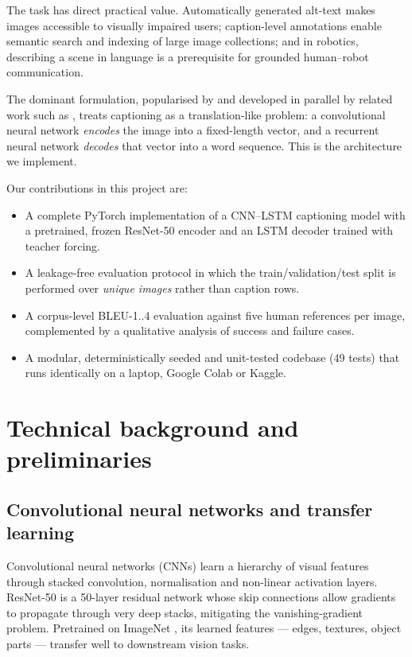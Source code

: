 \documentclass{article}
\begin{document}
The task has direct practical value. Automatically generated alt-text makes images accessible to visually impaired users; caption-level annotations enable semantic search and indexing of large
image collections; and in robotics, describing a scene in language is a prerequisite for grounded human--robot communication.

The dominant formulation, popularised by \citet{vinyals2015show} and developed in parallel by related work such as \citet{karpathy2015deep}, treats captioning as a translation-like problem: a convolutional neural network \emph{encodes} the image into a fixed-length vector, and a recurrent neural network \emph{decodes} that vector into a word sequence. This is the architecture we implement.

Our contributions in this project are:
\begin{itemize}
  \item A complete PyTorch implementation of a CNN--LSTM captioning model with a
        pretrained, frozen ResNet-50 encoder and an LSTM decoder trained with
        teacher forcing.
  \item A leakage-free evaluation protocol in which the train/validation/test
        split is performed over \emph{unique images} rather than caption rows.
  \item A corpus-level BLEU-1..4 evaluation against five human references per
        image, complemented by a qualitative analysis of success and failure cases.
  \item A modular, deterministically seeded and unit-tested codebase (49 tests)
        that runs identically on a laptop, Google Colab or Kaggle.
\end{itemize}


\section{Technical background and preliminaries}

\subsection{Convolutional neural networks and transfer learning}

Convolutional neural networks (CNNs) learn a hierarchy of visual features through stacked convolution, normalisation and non-linear activation layers. ResNet-50 \citep{he2016deep} is a 
50-layer residual network whose skip connections allow gradients to propagate through very deep 
stacks, mitigating the vanishing-gradient problem. Pretrained on ImageNet \citep{deng2009imagenet},
its learned features --- edges, textures, object parts --- transfer well to downstream vision tasks.
\end{document}
